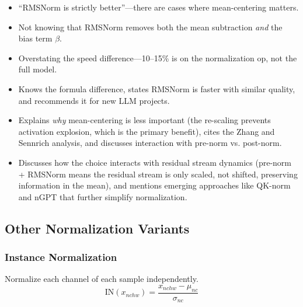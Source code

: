 \begin{interviewq}
\redflags
\begin{itemize}
    \item ``RMSNorm is strictly better''---there are cases where mean-centering matters.
    \item Not knowing that RMSNorm removes both the mean subtraction \textit{and} the bias term $\beta$.
    \item Overstating the speed difference---10--15\% is on the normalization op, not the full model.
\end{itemize}


\goodgreat
\begin{itemize}
    \item {} Knows the formula difference, states RMSNorm is faster with similar quality, and recommends it for new LLM projects.
    \item {} Explains \textit{why} mean-centering is less important (the re-scaling prevents activation explosion, which is the primary benefit), cites the Zhang and Sennrich analysis, and discusses interaction with pre-norm vs. post-norm.
    \item {} Discusses how the choice interacts with residual stream dynamics (pre-norm + RMSNorm means the residual stream is only scaled, not shifted, preserving information in the mean), and mentions emerging approaches like QK-norm and nGPT that further simplify normalization.
\end{itemize}

\end{interviewq}

\subsection{Other Normalization Variants}

\subsubsection{Instance Normalization}

Normalize each channel of each sample independently.
\begin{equation}
\text{IN}(x_{nchw}) = \frac{x_{nchw} - \mu_{nc}}{\sigma_{nc}}
\end{equation}

